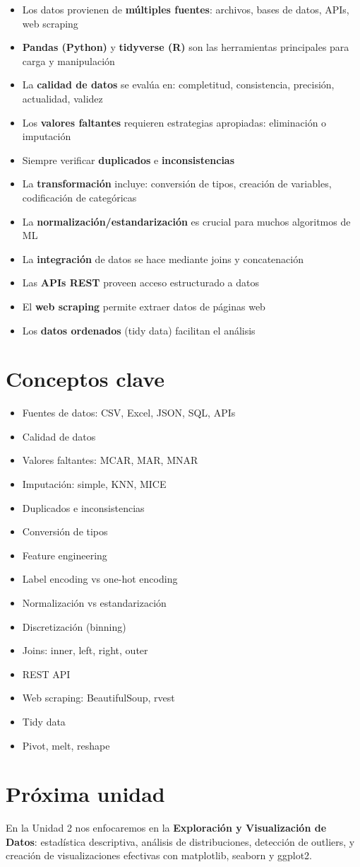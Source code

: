 \documentclass[a4paper,11pt]{article}
\begin{document}
\begin{itemize}[leftmargin=*]
    \item Los datos provienen de \textbf{múltiples fuentes}: archivos, bases de datos, APIs, web scraping
    \item \textbf{Pandas (Python)} y \textbf{tidyverse (R)} son las herramientas principales para carga y manipulación
    \item La \textbf{calidad de datos} se evalúa en: completitud, consistencia, precisión, actualidad, validez
    \item Los \textbf{valores faltantes} requieren estrategias apropiadas: eliminación o imputación
    \item Siempre verificar \textbf{duplicados} e \textbf{inconsistencias}
    \item La \textbf{transformación} incluye: conversión de tipos, creación de variables, codificación de categóricas
    \item La \textbf{normalización/estandarización} es crucial para muchos algoritmos de ML
    \item La \textbf{integración} de datos se hace mediante joins y concatenación
    \item Las \textbf{APIs REST} proveen acceso estructurado a datos
    \item El \textbf{web scraping} permite extraer datos de páginas web
    \item Los \textbf{datos ordenados} (tidy data) facilitan el análisis
\end{itemize}

\section*{Conceptos clave}

\begin{itemize}[leftmargin=*]
    \item Fuentes de datos: CSV, Excel, JSON, SQL, APIs
    \item Calidad de datos
    \item Valores faltantes: MCAR, MAR, MNAR
    \item Imputación: simple, KNN, MICE
    \item Duplicados e inconsistencias
    \item Conversión de tipos
    \item Feature engineering
    \item Label encoding vs one-hot encoding
    \item Normalización vs estandarización
    \item Discretización (binning)
    \item Joins: inner, left, right, outer
    \item REST API
    \item Web scraping: BeautifulSoup, rvest
    \item Tidy data
    \item Pivot, melt, reshape
\end{itemize}

\section*{Próxima unidad}

En la Unidad 2 nos enfocaremos en la \textbf{Exploración y Visualización de Datos}: estadística descriptiva, análisis de distribuciones, detección de outliers, y creación de visualizaciones efectivas con matplotlib, seaborn y ggplot2.
\end{document}
